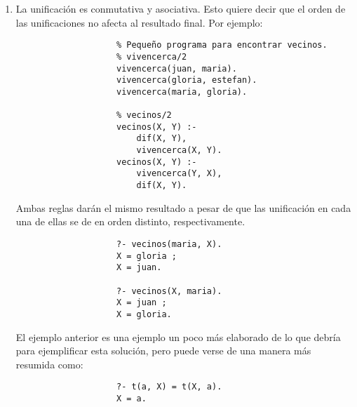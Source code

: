 \begin{enumerate}
\begin{itemize}
\begin{solution}
\begin{enumerate}
                \item La unificación es conmutativa y asociativa. Esto quiere decir que el orden de las unificaciones no afecta al resultado final. Por ejemplo:
                \begin{verbatim}
                    % Pequeño programa para encontrar vecinos.
                    % vivencerca/2 
                    vivencerca(juan, maria).
                    vivencerca(gloria, estefan).
                    vivencerca(maria, gloria).

                    % vecinos/2
                    vecinos(X, Y) :- 
                        dif(X, Y), 
                        vivencerca(X, Y).
                    vecinos(X, Y) :- 
                        vivencerca(Y, X), 
                        dif(X, Y).
                \end{verbatim}
                Ambas reglas darán el mismo resultado a pesar de que las unificación en cada una de ellas se de en orden distinto, respectivamente.
                \begin{verbatim}
                    ?- vecinos(maria, X).
                    X = gloria ;
                    X = juan.

                    ?- vecinos(X, maria).
                    X = juan ;
                    X = gloria.
                \end{verbatim}
                El ejemplo anterior es una ejemplo un poco más elaborado de lo que debría para ejemplificar esta solución, pero puede verse de una manera más resumida como:
                \begin{verbatim}
                    ?- t(a, X) = t(X, a).
                    X = a.


\end{verbatim}
\end{enumerate}
\end{solution}
\end{itemize}
\end{enumerate}
